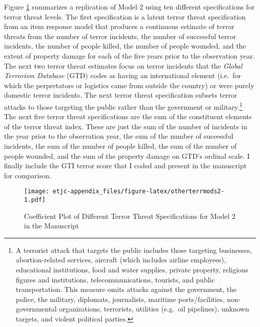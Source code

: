 \documentclass[11pt,]{article}
\makeatletter
\def\maxwidth{\ifdim\Gin@nat@width>\linewidth\linewidth
\else\Gin@nat@width\fi}
\let\Oldincludegraphics\includegraphics
\renewcommand{\includegraphics}[1]{\Oldincludegraphics[width=\maxwidth]{#1}}
\makeatother
\begin{document}
Figure \ref{fig:otherterrmods2} summarizes a replication of Model 2
using ten different specifications for terror threat levels. The first
specification is a latent terror threat specification from an item
response model \citep{samejima1969ela} that produces a continuous
estimate of terror threats from the number of terror incidents, the
number of successful terror incidents, the number of people killed, the
number of people wounded, and the extent of property damage for each of
the five years prior to the observation year. The next two terror threat
estimates focus on terror incidents that the \emph{Global Terrorism
Database} (GTD) \citeyearpar{gtd2014} codes as having an international
element (i.e.~for which the perpretators or logistics came from outside
the country) or were purely domestic terror incidents. The next terror
threat specification subsets terror attacks to those targeting the
public rather than the government or military.\footnote{A terrorist
  attack that targets the public includes those targeting businesses,
  abortion-related services, aircraft (which includes airline
  employees), educational institutions, food and water supplies, private
  property, religious figures and institutions, telecommunications,
  tourists, and public transportation. This measure omits attacks
  against the government, the police, the military, diplomats,
  journalists, maritime ports/facilities, non-governmental
  organizations, terrorists, utilities (e.g.~oil pipelines), unknown
  targets, and violent political parties.} The next five terror threat
specifications are the sum of the constituent elements of the terror
threat index. These are just the sum of the number of incidents in the
year prior to the observation year, the sum of the number of successful
incidents, the sum of the number of people killed, the sum of the number
of people wounded, and the sum of the property damage on GTD's ordinal
scale. I finally include the GTI terror score that I coded and present
in the manuscript for comparison.

\begin{figure}[htbp]
\centering
\texttt{[image: etjc-appendix\_files/figure-latex/otherterrmods2-1.pdf]}
\caption{\label{fig:otherterrmods2} Coefficient Plot of Different Terror
Threat Specifications for Model 2 in the Manuscript}
\end{figure}
\end{document}
